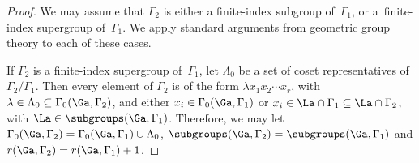 \begin{proof}
We may assume that $\Gamma_2$ is either a finite-index subgroup of~$\Gamma_1$, or a~finite-index supergroup of~$\Gamma_1$. We apply standard arguments from geometric group theory to each of these cases.

If $\Gamma_2$ is a finite-index supergroup of~$\Gamma_1$, let $\Lambda_0$ be a set of coset representatives of $\Gamma_2 / \Gamma_1$. Then every element of $\Gamma_2$ is of the form $\lambda x_1 x_2 \cdots x_r$, with $\lambda \in \Lambda_0 \subseteq \Gamma_0(\Ga,\Gamma_2)$, and either $x_i \in \Gamma_0(\Ga,\Gamma_1)$ or $x_i \in \La \cap \Gamma_1 \subseteq \La \cap \Gamma_2$, with $\La \in \subgroups(\Ga,\Gamma_1)$. Therefore, we may let $\Gamma_0(\Ga,\Gamma_2) = \Gamma_0(\Ga,\Gamma_1) \cup \Lambda_0$,
$\subgroups(\Ga,\Gamma_2) = \subgroups(\Ga,\Gamma_1)$ and $r(\Ga,\Gamma_2) = r(\Ga,\Gamma_1) + 1$.


\end{proof}
